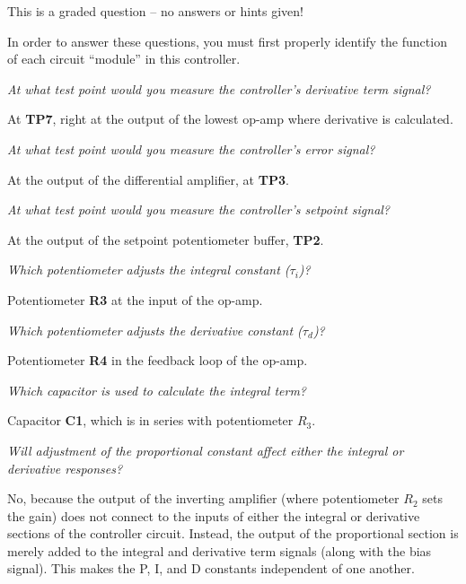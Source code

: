 \vfil 

\eject






This is a graded question -- no answers or hints given!







In order to answer these questions, you must first properly identify the function of each circuit ``module'' in this controller.

\vskip 10pt

{\it At what test point would you measure the controller's derivative term signal?}

At {\bf TP7}, right at the output of the lowest op-amp where derivative is calculated.
 
\vskip 10pt

{\it At what test point would you measure the controller's error signal?}

At the output of the differential amplifier, at {\bf TP3}.
 
\vskip 10pt

{\it At what test point would you measure the controller's setpoint signal?}

At the output of the setpoint potentiometer buffer, {\bf TP2}.
 
\vskip 10pt

{\it Which potentiometer adjusts the integral constant ($\tau_i$)?}

Potentiometer {\bf R3} at the input of the op-amp.
 
\vskip 10pt

{\it Which potentiometer adjusts the derivative constant ($\tau_d$)?}

Potentiometer {\bf R4} in the feedback loop of the op-amp.
 
\vskip 10pt

{\it Which capacitor is used to calculate the integral term?}

Capacitor {\bf C1}, which is in series with potentiometer $R_3$.
 
\vskip 10pt

{\it Will adjustment of the proportional constant affect either the integral or derivative responses?}

No, because the output of the inverting amplifier (where potentiometer $R_2$ sets the gain) does not connect to the inputs of either the integral or derivative sections of the controller circuit.  Instead, the output of the proportional section is merely added to the integral and derivative term signals (along with the bias signal).  This makes the P, I, and D constants independent of one another.
 



